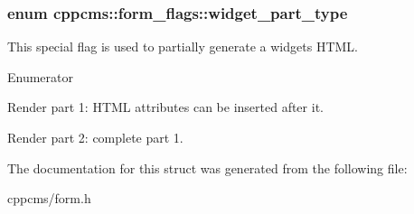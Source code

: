 \subsubsection[{widget\+\_\+part\+\_\+type}]{\setlength{\rightskip}{0pt plus 5cm}enum {\bf cppcms\+::form\+\_\+flags\+::widget\+\_\+part\+\_\+type}}\label{structcppcms_1_1form__flags_ad9bb784f4555eadd91825dc13223c90a}
This special flag is used to partially generate a widget\textquotesingle{}s H\+T\+ML. \begin{Desc}
\item[Enumerator]\par
\begin{description}
\item[{\em 
first\+\_\+part\label{structcppcms_1_1form__flags_ad9bb784f4555eadd91825dc13223c90aab1a8d6383cc6a46590fb188bbce43209}
}]Render part 1\+: H\+T\+ML attributes can be inserted after it. \item[{\em 
second\+\_\+part\label{structcppcms_1_1form__flags_ad9bb784f4555eadd91825dc13223c90aaf182b9b4f04b7c9ddcb37834a2c74559}
}]Render part 2\+: complete part 1. \end{description}
\end{Desc}


The documentation for this struct was generated from the following file\+:\begin{DoxyCompactItemize}
\item 
cppcms/form.\+h\end{DoxyCompactItemize}
